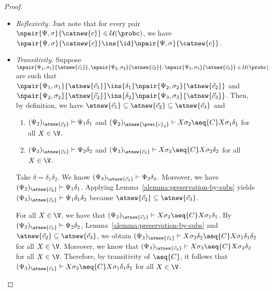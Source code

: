 \begin{proof}
\begin{itemize}
    \item \emph{Reflexivity.}  Just note that for every pair $\npair{\Psi,\sigma}{\catnew{c}}\in \mathcal{U}(\probc)$, we have $\npair{\Psi,\sigma}{\catnew{c}} \ins{\id} \npair{\Psi,\sigma}{\catnew{c}}$.

    \item \emph{Transitivity.} Suppose $ \npair{\Psi_1,\sigma_1}{\atnew{\vec{c}_1}} ,\npair{\Psi_2,\sigma_2}{\atnew{\vec{c}_2}},\npair{\Psi_3,\sigma_3}{\atnew{\vec{c}_3}}\in \mathcal{U}(\probc)$ are such that $\npair{\Psi_1,\sigma_1}{\atnew{\vec{c}_1}} \ins{\delta_1} \npair{\Psi_2,\sigma_2}{\atnew{\vec{c}_2}}$ and $\npair{\Psi_2,\sigma_2}{\atnew{\vec{c}_2}} \ins{\delta_2} \npair{\Psi_3,\sigma_3}{\atnew{\vec{c}_3}}$. Then, by definition, we have $\atnew{\vec{c}_1} \subseteq \atnew{\vec{c}_2} \subseteq \atnew{\vec{c}_3}$ and
          \begin{enumerate}
              \item $(\Psi_2)_{\atnew{\vec{c}_2}}\vdash \Psi_1\delta_1$  and  $(\Psi_2)_{\atnew{\pvec{c}_2}}\vdash X\sigma_2\aeq{C}X\sigma_1\delta_1$ for all $X\in\V$.
              \item  $(\Psi_3)_{\atnew{\vec{c}_3}}\vdash \Psi_2\delta_2$  and  $(\Psi_3)_{\atnew{\vec{c}_3}}\vdash X\sigma_3\aeq{C}X\sigma_2\delta_2$  for all $X\in\V$.
          \end{enumerate}
          Take $\delta = \delta_1\delta_2$. We know $(\Psi_3)_{\atnew{\vec{c}_3}}\vdash \Psi_2\delta_2$. Moreover, we have $(\Psi_2)_{\atnew{\vec{c}_2}}\vdash \Psi_1\delta_1$. Applying Lemma~\ref{alemma:preservation-by-subs} yields $(\Psi_3)_{\atnew{\vec{c}_3}}\vdash \Psi_1\delta_1\delta_2$ because $\atnew{\vec{c}_2}\subseteq\atnew{\vec{c}_3}$.

          For all $X\in \V$, we have that $(\Psi_2)_{\atnew{\vec{c}_2}}\vdash X\sigma_2\aeq{C}X\sigma_1\delta_1$. By $(\Psi_3)_{\atnew{\vec{c}_3}}\vdash \Psi_2\delta_2$, Lemma~\ref{alemma:preservation-by-subs} and $\atnew{\vec{c}_2}\subseteq\atnew{\vec{c}_3}$, we obtain  $(\Psi_3)_{\atnew{\vec{c}_3}}\vdash X\sigma_2\delta_2\aeq{C}X\sigma_1\delta_1\delta_2$ for all  $X\in\V$. Moreover, we know that $(\Psi_3)_{\atnew{\vec{c}_3}}\vdash X\sigma_3\aeq{C}X\sigma_2\delta_2$ for all $X\in\V$. Therefore, by transitivity of $\aeq{C}$, it follows that  $(\Psi_3)_{\atnew{\vec{c}_3}}\vdash X\sigma_3\aeq{C}X\sigma_1\delta_1\delta_2$ for all $X\in \V$.
\end{itemize}

\end{proof}

